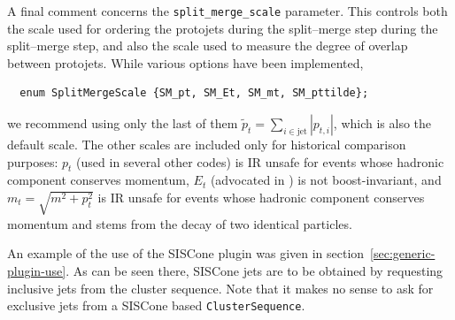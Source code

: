 \documentclass[12pt,a4]{article}
\newcommand{\fastjet}{\texttt{FastJet}\xspace}
\begin{document}
A final comment concerns the \verb:split_merge_scale:
parameter. This controls both the scale used for ordering the
protojets during the split--merge step during the split--merge step,
and also the scale used to measure the degree of overlap between
protojets. While various options have been implemented, 
\begin{lstlisting}
  enum SplitMergeScale {SM_pt, SM_Et, SM_mt, SM_pttilde};
\end{lstlisting}
we recommend using only the last of them $\tilde p_t = \sum_{i \in
  \mathrm{jet}}|p_{t,i}|$, which is also the default scale. The other
scales are included only for historical comparison purposes: $p_t$
(used in several other codes) is IR unsafe for events whose hadronic
component conserves momentum, $E_t$ (advocated in
\cite{RunII-jet-physics}) is not boost-invariant, and $m_t = \sqrt{m^2
  + p_t^2}$ is IR unsafe for events whose hadronic component conserves
momentum and stems from the decay of two identical particles.


An example of the use of the SISCone plugin was given in
section~\ref{sec:generic-plugin-use}. 
%
As can be seen there, SISCone jets are to be obtained by requesting
inclusive jets from the cluster sequence.
%
Note that it makes no sense to ask for exclusive jets from a
SISCone based \verb:ClusterSequence:.

% 
% 
% 
% 
% 
\end{document}
